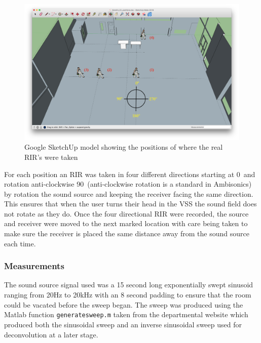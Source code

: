 \documentclass[../../main.tex]{subfiles}
\begin{document}
		\begin{figure}[ht]
			\begin{center}
				\includegraphics[scale = 0.3]{Sections/Implementation/RealRIRs/images/Real_RIRs7_editV2.png} 
				\caption{Google SketchUp model showing the positions of where the real \ac{RIR}'s were taken}
				\label{rirPositions}
			\end{center}
		\end{figure}

	For each position an \ac{RIR} was taken in four different directions  starting at 0\textdegree~and rotation anti-clockwise 90\textdegree~(anti-clockwise rotation is a standard in Ambisonics) by rotation the sound source and keeping the receiver facing the same direction. This ensures that when the user turns their head in the \ac{VSS} the sound field does not rotate as they do. Once the four directional \ac{RIR} were recorded, the source and receiver were moved to the next marked location with care being taken to make sure the receiver is placed the same distance away from the sound source each time.

	\subsubsection{Measurements}
		The sound source signal used was a 15 second long exponentially swept sinusoid ranging from 20Hz to 20kHz with an 8 second padding to ensure that the room could be vacated before the sweep began. The sweep was produced using the Matlab function \texttt{generatesweep.m} taken from the departmental website \cite{sineSweep} which produced both the sinusoidal sweep and an inverse sinusoidal sweep used for deconvolution at a later stage.
		
\end{document}
